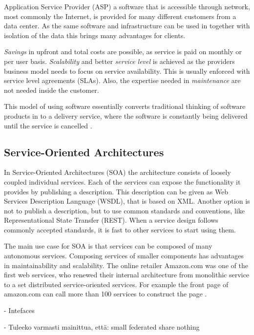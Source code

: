 \documentclass{tktltiki}
\begin{document}
Application Service Provider (ASP) a software that is accessible through network, most commonly the Internet, is provided for many different customers from a data center.  As the same software and infrastructure can be used in together with isolation of the data this brings many advantages for clients.

\emph{Savings} in upfront and total costs are possible, as service is paid on monthly or per user basis. \emph{Scalability} and better \emph{service level} is achieved as the providers business model needs to focus on service availability.  This is usually enforced with service level agreements (SLAs).  Also, the expertise needed in \emph{maintenance} are not needed inside the customer.

This model of using software essentially converts traditional thinking of software products in to a delivery service, where the software is constantly being delivered until the service is cancelled \cite{asp}.



\subsection{Service-Oriented Architectures}

In Service-Oriented Architectures (SOA) the architecture consists of loosely coupled individual services.  Each of the services can expose the functionality it provides by publishing a description.  This description can be given as Web Services Description Language (WSDL), that is based on XML.  Another option is not to publish a description, but to use common standards and conventions, like Representational State Transfer (REST).  When a service design follows commonly accepted standards, it is fast to other services to start using them.

The main use case for SOA is that services can be composed of many autonomous services.  Composing services of smaller components has advantages in maintainability and scalability.  The online retailer Amazon.com was one of the first web services, who renewed their internal architecture from monolithic service to a set distributed service-oriented services.  For example the front page of amazon.com can call more than 100 services to construct the page \cite{vogels}.

- Intefaces

- Tuleeko varmasti mainittua, että: small federated share nothing
\end{document}
